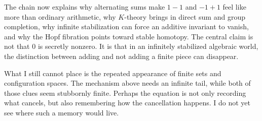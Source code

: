 The chain now explains why alternating sums make \(1-1\) and \(-1+1\) feel like more than ordinary arithmetic, why \(K\)-theory brings in direct sum and group completion, why infinite stabilization can force an additive invariant to vanish, and why the Hopf fibration points toward stable homotopy.  The central claim is not that \(0\) is secretly nonzero.  It is that in an infinitely stabilized algebraic world, the distinction between adding and not adding a finite piece can disappear.

What I still cannot place is the repeated appearance of finite sets and configuration spaces.  The mechanism above needs an infinite tail, while both of those clues seem stubbornly finite.  Perhaps the equation is not only recording what cancels, but also remembering how the cancellation happens.  I do not yet see where such a memory would live.
